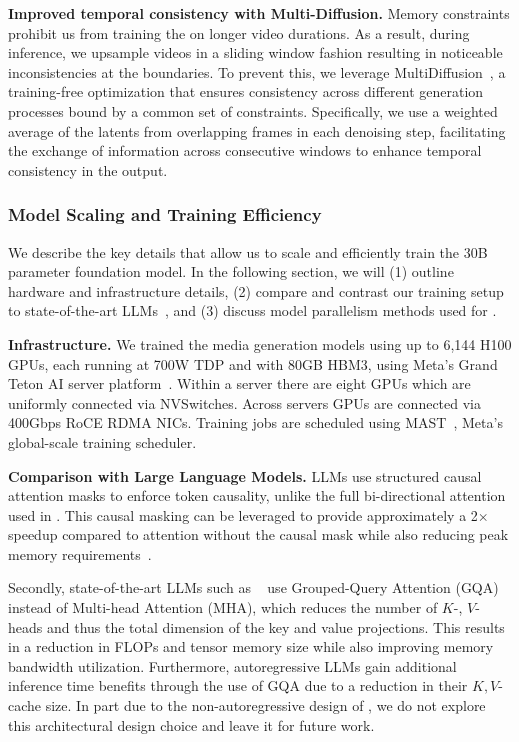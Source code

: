\noindent \textbf{Improved temporal consistency with Multi-Diffusion.}
Memory constraints prohibit us from training the \upsampler on longer video durations. As a result, during inference, we upsample videos in a sliding window fashion resulting in noticeable inconsistencies at the boundaries.
To prevent this, we leverage MultiDiffusion~\citep{bar2023multidiffusion}, a training-free optimization that ensures consistency across different generation processes bound by a common set of constraints.
Specifically, we use a weighted average of the latents from overlapping frames in each denoising step, facilitating the exchange of information across consecutive windows to enhance temporal consistency in the output.






\subsubsection{Model Scaling and Training Efficiency}
\label{sec:t2v_impl_scaling}

We describe the key details that allow us to scale and efficiently train the \OursVideo 30B parameter foundation model.
In the following section, we will (1) outline hardware and infrastructure details, (2) compare and contrast our training setup to state-of-the-art LLMs~\citep{llama2,llama3}, and (3) discuss model parallelism methods used for \OursVideo.





\noindent \textbf{Infrastructure.}
We trained the media generation models using up to 6,144 H100 GPUs, each running at 700W TDP and with 80GB HBM3, using Meta’s Grand Teton AI server platform~\citep{grand_teton}.
Within a server there are eight GPUs which are uniformly connected via NVSwitches. Across servers GPUs are connected via 400Gbps RoCE RDMA NICs.
Training jobs are scheduled using MAST~\citep{choudhury2024mast}, Meta's global-scale training scheduler.

\noindent \textbf{Comparison with Large Language Models.}
LLMs use structured causal attention masks to enforce token causality, unlike the full bi-directional attention used in \OursVideo. This causal masking can be leveraged to provide approximately a 2$\times$ speedup compared to attention without the causal mask while also reducing peak memory requirements~\citep{dao2023flashattention2}.

Secondly, state-of-the-art LLMs such as \llama~\citep{llama3} use Grouped-Query Attention (GQA) instead of Multi-head Attention (MHA), which reduces the number of $K$-, $V$-heads and thus the total dimension of the key and value projections. This results in a reduction in FLOPs and tensor memory size while also improving memory bandwidth utilization.
Furthermore, autoregressive LLMs gain additional inference time benefits through the use of GQA due to a reduction in their $K,V$-cache size.
In part due to the non-autoregressive design of \OursVideo, we do not explore this architectural design choice and leave it for future work.

